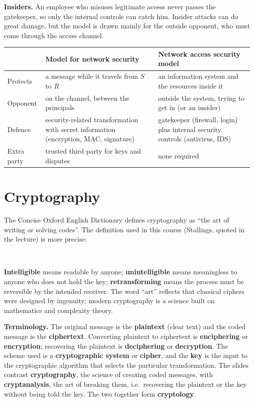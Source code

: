 \textbf{Insiders.} An employee who misuses legitimate access never passes the gatekeeper, so only the internal controls can catch him. Insider attacks can do great damage, but the model is drawn mainly for the outside opponent, who must come through the access channel.

\begin{center}\small
\begin{tabularx}{\textwidth}{@{}l X X@{}}
\toprule
 & Model for network security & Network access security model\\
\midrule
Protects & a message while it travels from $S$ to $R$ & an information system and the resources inside it\\
Opponent & on the channel, between the principals & outside the system, trying to get in (or an insider)\\
Defence & security-related transformation with secret information (encryption, MAC, signature) & gatekeeper (firewall, login) plus internal security controls (antivirus, IDS)\\
Extra party & trusted third party for keys and disputes & none required\\
\bottomrule
\end{tabularx}
\end{center}

\section{Cryptography}\label{sec:cryptobasics}

The Concise Oxford English Dictionary defines cryptography as ``the art of writing or solving codes''. The definition used in this course (Stallings, quoted in the lecture) is more precise:
\begin{center}
\\
\end{center}
\textbf{Intelligible} means readable by anyone; \textbf{unintelligible} means meaningless to anyone who does not hold the key; \textbf{retransforming} means the process must be reversible by the intended receiver. The word ``art'' reflects that classical ciphers were designed by ingenuity; modern cryptography is a science built on mathematics and complexity theory.

\textbf{Terminology.} The original message is the \textbf{plaintext} (clear text) and the coded message is the \textbf{ciphertext}. Converting plaintext to ciphertext is \textbf{enciphering} or \textbf{encryption}; recovering the plaintext is \textbf{deciphering} or \textbf{decryption}. The scheme used is a \textbf{cryptographic system} or \textbf{cipher}, and the \textbf{key} is the input to the cryptographic algorithm that selects the particular transformation. The slides contrast \textbf{cryptography}, the science of creating coded messages, with \textbf{cryptanalysis}, the art of breaking them, i.e.\ recovering the plaintext or the key without being told the key. The two together form \textbf{cryptology}.


